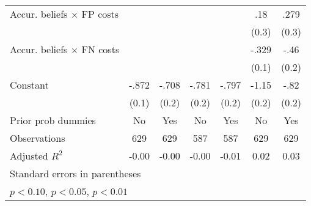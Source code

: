 \begin{table}[htbp]
\begin{tabular}{l*{6}{c}}
Accur. beliefs $\times$ FP costs&                  &                  &                  &                  &      .18         &     .279         \\
                &                  &                  &                  &                  &    (0.3)         &    (0.3)         \\
Accur. beliefs $\times$ FN costs&                  &                  &                  &                  &    -.329\sym{**} &     -.46\sym{***}\\
                &                  &                  &                  &                  &    (0.1)         &    (0.2)         \\
Constant        &    -.872\sym{***}&    -.708\sym{***}&    -.781\sym{***}&    -.797\sym{***}&    -1.15\sym{***}&     -.82\sym{***}\\
                &    (0.1)         &    (0.2)         &    (0.2)         &    (0.2)         &    (0.2)         &    (0.2)         \\
Prior prob dummies &       No         &      Yes         &       No         &      Yes         &       No         &      Yes         \\
\hline
Observations    &      629         &      629         &      587         &      587         &      629         &      629         \\
Adjusted \(R^{2}\)&    -0.00         &    -0.00         &    -0.00         &    -0.01         &     0.02         &     0.03         \\
\hline\hline
\multicolumn{7}{l}{\footnotesize Standard errors in parentheses}\\
\multicolumn{7}{l}{\footnotesize \sym{*} \(p<0.10\), \sym{**} \(p<0.05\), \sym{***} \(p<0.01\)}\\
\end{tabular}
\end{table}
